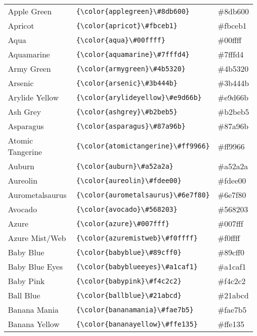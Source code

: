 \documentclass[9.5pt]{article}
\begin{document}
\begin{longtable}{l | l | l}
	Apple Green & \verb!{\color{applegreen}\#8db600}! & {\color{applegreen}\#8db600}\\
	Apricot & \verb!{\color{apricot}\#fbceb1}! & {\color{apricot}\#fbceb1}\\
	Aqua & \verb!{\color{aqua}\#00ffff}! & {\color{aqua}\#00ffff}\\
	Aquamarine & \verb!{\color{aquamarine}\#7fffd4}! & {\color{aquamarine}\#7fffd4}\\
	Army Green & \verb!{\color{armygreen}\#4b5320}! & {\color{armygreen}\#4b5320}\\
	Arsenic & \verb!{\color{arsenic}\#3b444b}! & {\color{arsenic}\#3b444b}\\
	Arylide Yellow & \verb!{\color{arylideyellow}\#e9d66b}! & {\color{arylideyellow}\#e9d66b}\\
	Ash Grey & \verb!{\color{ashgrey}\#b2beb5}! & {\color{ashgrey}\#b2beb5}\\
	Asparagus & \verb!{\color{asparagus}\#87a96b}! & {\color{asparagus}\#87a96b}\\
	Atomic Tangerine & \verb!{\color{atomictangerine}\#ff9966}! & {\color{atomictangerine}\#ff9966}\\
	Auburn & \verb!{\color{auburn}\#a52a2a}! & {\color{auburn}\#a52a2a}\\
	Aureolin & \verb!{\color{aureolin}\#fdee00}! & {\color{aureolin}\#fdee00}\\
	Aurometalsaurus & \verb!{\color{aurometalsaurus}\#6e7f80}! & {\color{aurometalsaurus}\#6e7f80}\\
	Avocado & \verb!{\color{avocado}\#568203}! & {\color{avocado}\#568203}\\
	Azure & \verb!{\color{azure}\#007fff}! & {\color{azure}\#007fff}\\
	Azure Mist/Web & \verb!{\color{azuremistweb}\#f0ffff}! & {\color{azuremistweb}\#f0ffff}\\
	Baby Blue & \verb!{\color{babyblue}\#89cff0}! & {\color{babyblue}\#89cff0}\\
	Baby Blue Eyes & \verb!{\color{babyblueeyes}\#a1caf1}! & {\color{babyblueeyes}\#a1caf1}\\
	Baby Pink & \verb!{\color{babypink}\#f4c2c2}! & {\color{babypink}\#f4c2c2}\\
	Ball Blue & \verb!{\color{ballblue}\#21abcd}! & {\color{ballblue}\#21abcd}\\
	Banana Mania & \verb!{\color{bananamania}\#fae7b5}! & {\color{bananamania}\#fae7b5}\\
	Banana Yellow & \verb!{\color{bananayellow}\#ffe135}! & {\color{bananayellow}\#ffe135}\\

\end{longtable}
\end{document}
